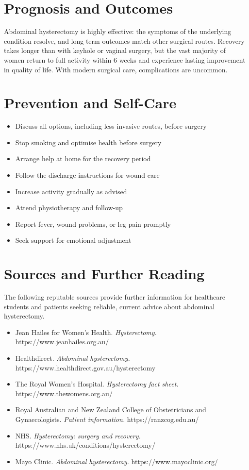 \section*{Prognosis and Outcomes}
Abdominal hysterectomy is highly effective: the symptoms of the underlying condition resolve, and long-term outcomes match other surgical routes. Recovery takes longer than with keyhole or vaginal surgery, but the vast majority of women return to full activity within 6 weeks and experience lasting improvement in quality of life. With modern surgical care, complications are uncommon.

\section*{Prevention and Self-Care}
\begin{itemize}
    \item Discuss all options, including less invasive routes, before surgery
    \item Stop smoking and optimise health before surgery
    \item Arrange help at home for the recovery period
    \item Follow the discharge instructions for wound care
    \item Increase activity gradually as advised
    \item Attend physiotherapy and follow-up
    \item Report fever, wound problems, or leg pain promptly
    \item Seek support for emotional adjustment
\end{itemize}

\section*{Sources and Further Reading}
The following reputable sources provide further information for healthcare students and patients seeking reliable, current advice about abdominal hysterectomy.

\begin{itemize}
    \item Jean Hailes for Women's Health. \textit{Hysterectomy.} https://www.jeanhailes.org.au/
    \item Healthdirect. \textit{Abdominal hysterectomy.} https://www.healthdirect.gov.au/hysterectomy
    \item The Royal Women's Hospital. \textit{Hysterectomy fact sheet.} https://www.thewomens.org.au/
    \item Royal Australian and New Zealand College of Obstetricians and Gynaecologists. \textit{Patient information.} https://ranzcog.edu.au/
    \item NHS. \textit{Hysterectomy: surgery and recovery.} https://www.nhs.uk/conditions/hysterectomy/
    \item Mayo Clinic. \textit{Abdominal hysterectomy.} https://www.mayoclinic.org/
\end{itemize}
